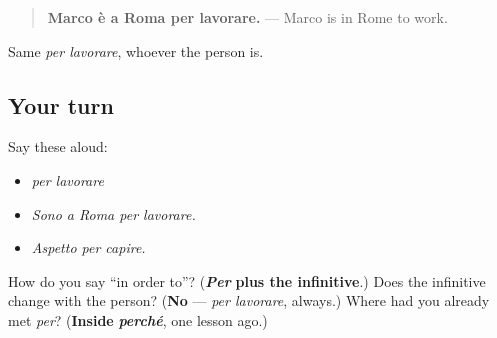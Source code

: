 \begin{quote}
\textbf{Marco è a Roma per lavorare.} — Marco is in Rome to work.
\end{quote}

Same \emph{per lavorare}, whoever the person is.

\subsection*{Your turn}
Say these aloud:

\begin{itemize}
\raggedright
  \item \emph{per lavorare}
  \item \emph{Sono a Roma per lavorare.}
  \item \emph{Aspetto per capire.}
\end{itemize}

\begin{tcolorbox}[breakable,colback=teal!4,colframe=teal!35!black,title={Before you move on}]
How do you say \textquotedblleft{}in order to\textquotedblright{}? (\emph{\textbf{Per}} \textbf{plus the infinitive}.) Does the infinitive change with the person? (\textbf{No} — \emph{per lavorare}, always.) Where had you already met \emph{per}? (\textbf{Inside} \emph{\textbf{perché}}, one lesson ago.)
\end{tcolorbox}

